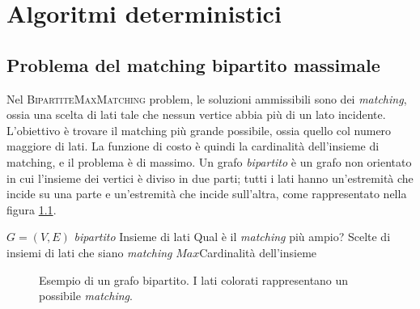 \chapter{Algoritmi deterministici}
\section{Problema del matching bipartito massimale}
Nel \textsc{BipartiteMaxMatching} problem, le soluzioni ammissibili sono dei
\textit{matching}, ossia una scelta di lati tale che nessun vertice abbia più di
un lato incidente. L'obiettivo è trovare il matching più grande possibile, ossia
quello col numero maggiore di lati. La funzione di costo è quindi la cardinalità
dell'insieme di matching, e il problema è di massimo.
Un grafo \textit{bipartito} è un grafo non orientato in cui l'insieme dei vertici
è diviso in due parti; tutti i lati hanno un'estremità che incide su una parte
e un'estremità che incide sull'altra, come rappresentato nella figura \ref{fig:graphmatching}.

 {$G = (V,E)$ \textit{bipartito}} {Insieme di lati}
{Qual è il \textit{matching} più ampio?} {Scelte di insiemi di lati che siano \textit{matching}}
{$Max$}{Cardinalità dell'insieme}

\begin{figure}[h]
	\centering
	\caption{Esempio di un grafo bipartito. I lati colorati rappresentano un possibile \textit{matching}.}
	\label{fig:graphmatching}
\end{figure}

